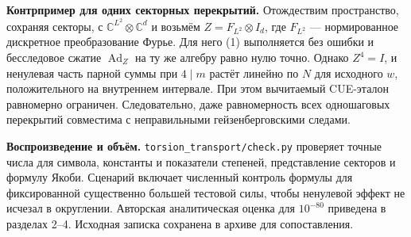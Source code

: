 \documentclass[11pt,a4paper]{article}
\newcommand{\Ad}{\operatorname{Ad}}
\newcommand{\C}{\mathbb C}
\newcommand{\subt}[1]{\par\medskip\noindent\textbf{#1.}\quad}
\begin{document}
\subt{Контрпример для одних секторных перекрытий}
Отождествим пространство, сохраняя секторы, с \(\C^{L^2}\otimes\C^d\) и возьмём \(Z=F_{L^2}\otimes I_d\), где \(F_{L^2}\) — нормированное дискретное преобразование Фурье. Для него (1) выполняется без ошибки и бесследовое сжатие \(\Ad_Z\) на ту же алгебру равно нулю точно. Однако \(Z^4=I\), и ненулевая часть парной суммы при \(4\mid m\) растёт линейно по \(N\) для исходного \(w\), положительного на внутреннем интервале. При этом вычитаемый CUE-эталон равномерно ограничен. Следовательно, даже равномерность всех одношаговых перекрытий совместима с неправильными гейзенберговскими следами.

\subt{Воспроизведение и объём}
\texttt{torsion\_transport/check.py} проверяет точные числа для символа, константы и показатели степеней, представление секторов и формулу Якоби. Сценарий включает численный контроль формулы для фиксированной существенно большей тестовой силы, чтобы ненулевой эффект не исчезал в округлении. Авторская аналитическая оценка для \(10^{-80}\) приведена в разделах 2--4. Исходная записка сохранена в архиве для сопоставления.
\end{document}
